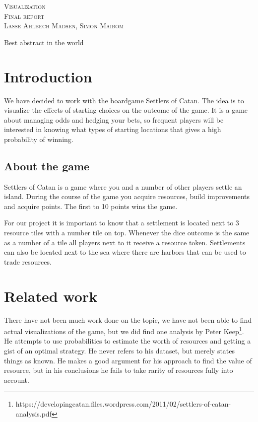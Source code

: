 \documentclass{article}
\begin{document}
\begin{center}
\textsc{\Large Visualization}\\[0.5cm]
\textsc{\large Final report}\\[0.5cm]
\textsc{\large Lasse Ahlbech Madsen, Simon Maibom}\\[0.5cm]
\vspace{1 cm}
\end{center}
\tableofcontents

\abstract

Best abstract in the world

\section{Introduction}

We have decided to work with the boardgame Settlers of Catan. The idea is to
visualize the effects of starting choices on the outcome of the game. It is a
game about managing odds and hedging your bets, so frequent players will be
interested in knowing what types of starting locations that gives a high
probability of winning.

\subsection{About the game}

Settlers of Catan is a game where you and a number of other players settle
an island. During the course of the game you acquire resources, build
improvements and acquire points. The first to 10 points wins the game.

For our project it is important to know that a settlement is located next
to 3 resource tiles with a number tile on top. Whenever the dice outcome is
the same as a number of a tile all players next to it receive a resource
token. Settlements can also be located next to the sea where there are harbors
that can be used to trade resources.

\section{Related work}

There have not been much work done on the topic, we have not been able to find
actual visualizations of the game, but we did find one analysis by
Peter
Keep\footnote{https://developingcatan.files.wordpress.com/2011/02/settlers-of-catan-analysis.pdf}.
He attempts to use probabilities to estimate the worth of resources and getting 
a gist of an optimal strategy. He never refers to his dataset, but merely states
things as known. He makes a good argument for his approach to find the value
of resource, but in his conclusions he fails to take rarity of resources fully
into account.
\end{document}
